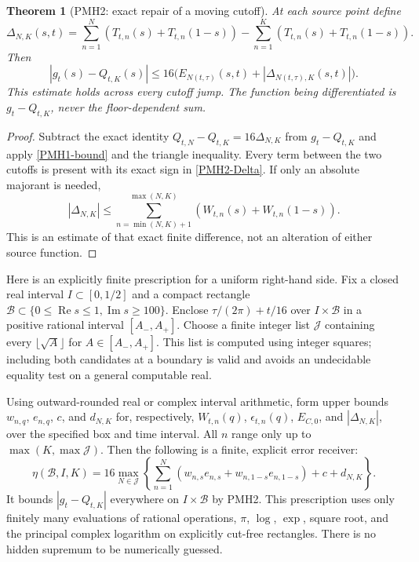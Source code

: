 \documentclass[11pt]{article}
\newtheorem{theorem}{Theorem}
\newcommand{\Rea}{\operatorname{Re}}
\newcommand{\Ima}{\operatorname{Im}}
\begin{document}
\begin{theorem}[PMH2: exact repair of a moving cutoff]
\label{PMH2}
At each source point define
\begin{equation}\label{PMH2-Delta}
 \Delta_{N,K}(s,t)=\sum_{n=1}^N
 (T_{t,n}(s)+T_{t,n}(1-s))-
 \sum_{n=1}^K(T_{t,n}(s)+T_{t,n}(1-s)).
\end{equation}
Then
\begin{equation}\label{PMH2-bound}
 |g_t(s)-Q_{t,K}(s)|\le
 16\bigl(E_{N(t,\tau)}(s,t)+|\Delta_{N(t,\tau),K}(s,t)|\bigr).
\end{equation}
This estimate holds across every cutoff jump. The function being
differentiated is $g_t-Q_{t,K}$, never the floor-dependent sum.
\end{theorem}
\begin{proof}
Subtract the exact identity
$Q_{t,N}-Q_{t,K}=16\Delta_{N,K}$ from $g_t-Q_{t,K}$ and apply
\eqref{PMH1-bound} and the triangle inequality. Every term between
the two cutoffs is present with its exact sign in
\eqref{PMH2-Delta}. If only an absolute majorant is needed,
\[
 |\Delta_{N,K}|\le\sum_{n=\min(N,K)+1}^{\max(N,K)}
           (W_{t,n}(s)+W_{t,n}(1-s)).
\]
This is an estimate of that exact finite difference, not an alteration
of either source function.
\end{proof}

Here is an explicitly finite prescription for a uniform right-hand
side. Fix a closed real interval $I\subset[0,1/2]$ and a compact
rectangle $\mathcal B\subset\{0\le\Rea s\le1,\Ima s\ge100\}$.
Enclose $\tau/(2\pi)+t/16$ over $I\times\mathcal B$ in a positive
rational interval $[A_-,A_+]$. Choose a finite integer list
$\mathcal J$ containing every $\lfloor\sqrt A\rfloor$ for
$A\in[A_-,A_+]$. This list is computed using integer squares;
including both candidates at a boundary is valid and avoids an
undecidable equality test on a general computable real.

Using outward-rounded real or complex interval arithmetic, form
upper bounds $w_{n,q}$, $e_{n,q}$, $c$, and $d_{N,K}$ for,
respectively, $W_{t,n}(q)$, $\epsilon_{t,n}(q)$,
$E_{C,0}$, and $|\Delta_{N,K}|$, over the specified box and time
interval. All $n$ range only up to $\max(K,\max\mathcal J)$.
Then the following is a finite, explicit error receiver:
\begin{equation}\label{PMH2-box}
 \eta(\mathcal B,I,K)=16\max_{N\in\mathcal J}
 \left\{\sum_{n=1}^N
 (w_{n,s}e_{n,s}+w_{n,1-s}e_{n,1-s})+c+d_{N,K}\right\}.
\end{equation}
It bounds $|g_t-Q_{t,K}|$ everywhere on $I\times\mathcal B$ by
PMH2. This prescription uses only finitely many evaluations of
rational operations, $\pi$, $\log$, $\exp$, square root, and the
principal complex logarithm on explicitly cut-free rectangles.
There is no hidden supremum to be numerically guessed.
\end{document}
